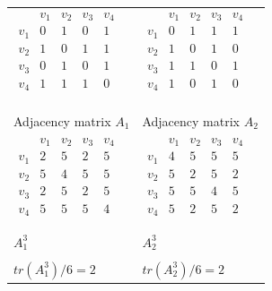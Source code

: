 \begin{enumerate}
\begin{enumerate}
\begin{tabular}{  m{3cm} m{3cm} }
    $\begin{matrix}
            & v_1 & v_2 & v_3    & v_4  \\
            v_1 & 0   & 1   & 0 & 1 \\
            v_2 & 1   & 0   & 1      & 1 \\
            v_3 & 0 & 1 & 0 & 1\\
            v_4 & 1 & 1 & 1 & 0 \\
    \end{matrix}$
    &
    $\begin{matrix}
            & v_1 & v_2 & v_3    & v_4  \\
            v_1 & 0   &  1   &  1 & 1 \\
            v_2 & 1   & 0   & 1      & 0\\
            v_3 & 1 & 1 & 0 & 1\\
            v_4 & 1 & 0 & 1 & 0 \\
    \end{matrix}$ \\
    \\
    \\
    Adjacency matrix $A_1$ & Adjacency matrix $A_2$\\
    $\begin{matrix}
            & v_1 & v_2 & v_3    & v_4  \\
            v_1 & 2   & 5   & 2 & 5 \\
            v_2 & 5   & 4   & 5 & 5 \\
            v_3 & 2 & 5 & 2 & 5\\
            v_4 & 5 & 5 & 5 & 4 \\
    \end{matrix}$
    &
        $\begin{matrix}
            & v_1 & v_2 & v_3    & v_4  \\
            v_1 & 4   & 5   & 5 & 5 \\
            v_2 & 5   & 2   & 5 & 2 \\
            v_3 & 5 & 5 & 4 & 5\\
            v_4 & 5 & 2 & 5 & 2 \\
    \end{matrix}$
    \\
    
    \\
     $A_1^3$ &  $A_2^3$\\
     \\
     $tr(A_1^3)/6 = 2$ & $tr(A_2^3)/6 = 2$
\end{tabular}


\end{enumerate}
\end{enumerate}
